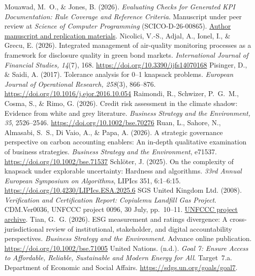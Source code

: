 \begin{thebibliography}{}
 Mouawad, M.~O., \& Jones, B. (2026). \emph{Evaluating Checks for Generated KPI Documentation: Rule Coverage and Reference Criteria}. Manuscript under peer review at \emph{Science of Computer Programming} (SCICO-D-26-00865). \href{https://github.com/Meshaal-Mouawad/Paper_2_JSS/blob/1fe7d8c1efe0e90b036f81ae319fbcffb80a262a/main.pdf}{Author manuscript and replication materials}.
 Nicolici, V.-S., Adjal, A., Ionel, I., \& Grecu, E. (2026). Integrated management of air-quality monitoring processes as a framework for disclosure quality in green bond markets. \emph{International Journal of Financial Studies, 14}(7), 168. \url{https://doi.org/10.3390/ijfs14070168}
 Pisinger, D., \& Saidi, A. (2017). Tolerance analysis for 0--1 knapsack problems. \emph{European Journal of Operational Research, 258}(3), 866--876. \url{https://doi.org/10.1016/j.ejor.2016.10.054}
 Raimondi, R., Schwizer, P.~G.~M., Cosma, S., \& Rimo, G. (2026). Credit risk assessment in the climate shadow: Evidence from white and grey literature. \emph{Business Strategy and the Environment, 35}, 2526--2546. \url{https://doi.org/10.1002/bse.70276}
 Ruan, L., Sahore, N., Almasabi, S.~S., Di Vaio, A., \& Papa, A. (2026). A strategic governance perspective on carbon accounting enablers: An in-depth qualitative examination of business strategies. \emph{Business Strategy and the Environment}, e71537. \url{https://doi.org/10.1002/bse.71537}
 Schlöter, J. (2025). On the complexity of knapsack under explorable uncertainty: Hardness and algorithms. \emph{33rd Annual European Symposium on Algorithms}, LIPIcs 351, 6:1--6:15. \url{https://doi.org/10.4230/LIPIcs.ESA.2025.6}
 SGS United Kingdom Ltd. (2008). \emph{Verification and Certification Report: Copiulemu Landfill Gas Project}. CDM.Ver0036, UNFCCC project 0096, 30 July, pp.~10--11. \href{https://cdm.unfccc.int/Projects/DB/DNV-CUK1126875537.72/iProcess/SGS-UKL1188294574.74/ReviewInitialComments/NEXNYPXPNJFC9OOG8BF6DBO3EOC9Q4}{UNFCCC project archive}.
 Tian, G.~G. (2026). ESG measurement and ratings divergence: A cross-jurisdictional review of institutional, stakeholder, and digital accountability perspectives. \emph{Business Strategy and the Environment}. Advance online publication. \url{https://doi.org/10.1002/bse.71005}
 United Nations. (n.d.). \emph{Goal 7: Ensure Access to Affordable, Reliable, Sustainable and Modern Energy for All}. Target~7.a. Department of Economic and Social Affairs. \url{https://sdgs.un.org/goals/goal7}.

\end{thebibliography}
